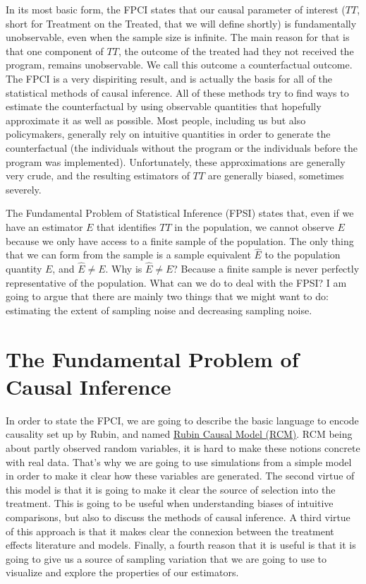 \documentclass[]{book}
\theoremstyle{definition}
\theoremstyle{definition}
\theoremstyle{definition}
\theoremstyle{remark}
\begin{document}
In its most basic form, the FPCI states that our causal parameter of
interest (\(TT\), short for Treatment on the Treated, that we will
define shortly) is fundamentally unobservable, even when the sample size
is infinite. The main reason for that is that one component of \(TT\),
the outcome of the treated had they not received the program, remains
unobservable. We call this outcome a counterfactual outcome. The FPCI is
a very dispiriting result, and is actually the basis for all of the
statistical methods of causal inference. All of these methods try to
find ways to estimate the counterfactual by using observable quantities
that hopefully approximate it as well as possible. Most people,
including us but also policymakers, generally rely on intuitive
quantities in order to generate the counterfactual (the individuals
without the program or the individuals before the program was
implemented). Unfortunately, these approximations are generally very
crude, and the resulting estimators of \(TT\) are generally biased,
sometimes severely.

The Fundamental Problem of Statistical Inference (FPSI) states that,
even if we have an estimator \(E\) that identifies \(TT\) in the
population, we cannot observe \(E\) because we only have access to a
finite sample of the population. The only thing that we can form from
the sample is a sample equivalent \(\hat{E}\) to the population quantity
\(E\), and \(\hat{E}\neq E\). Why is \(\hat{E}\neq E\)? Because a finite
sample is never perfectly representative of the population. What can we
do to deal with the FPSI? I am going to argue that there are mainly two
things that we might want to do: estimating the extent of sampling noise
and decreasing sampling noise.

\chapter{The Fundamental Problem of Causal
Inference}\label{the-fundamental-problem-of-causal-inference}

In order to state the FPCI, we are going to describe the basic language
to encode causality set up by Rubin, and named \href{RCM.html}{Rubin
Causal Model (RCM)}. RCM being about partly observed random variables,
it is hard to make these notions concrete with real data. That's why we
are going to use simulations from a simple model in order to make it
clear how these variables are generated. The second virtue of this model
is that it is going to make it clear the source of selection into the
treatment. This is going to be useful when understanding biases of
intuitive comparisons, but also to discuss the methods of causal
inference. A third virtue of this approach is that it makes clear the
connexion between the treatment effects literature and models. Finally,
a fourth reason that it is useful is that it is going to give us a
source of sampling variation that we are going to use to visualize and
explore the properties of our estimators.
\end{document}
